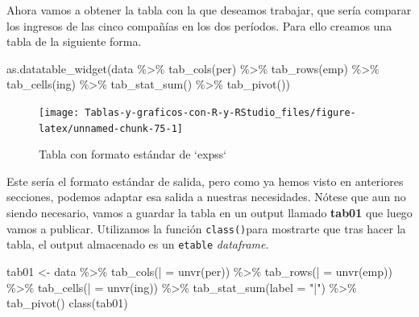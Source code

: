 \documentclass[
]{book}
\newenvironment{Shaded}{\begin{snugshade}}{\end{snugshade}}
\newcommand{\AttributeTok}[1]{\textcolor[rgb]{0.77,0.63,0.00}{#1}}
\newcommand{\FunctionTok}[1]{\textcolor[rgb]{0.00,0.00,0.00}{#1}}
\newcommand{\NormalTok}[1]{#1}
\newcommand{\OtherTok}[1]{\textcolor[rgb]{0.56,0.35,0.01}{#1}}
\newcommand{\SpecialCharTok}[1]{\textcolor[rgb]{0.00,0.00,0.00}{#1}}
\newcommand{\StringTok}[1]{\textcolor[rgb]{0.31,0.60,0.02}{#1}}
\begin{document}
Ahora vamos a obtener la tabla con la que deseamos trabajar, que sería comparar los ingresos de las cinco compañías en los dos períodos. Para ello creamos una tabla de la siguiente forma.

\begin{Shaded}
\begin{Highlighting}[]
\FunctionTok{as.datatable\_widget}\NormalTok{(data }\SpecialCharTok{\%\textgreater{}\%}
  \FunctionTok{tab\_cols}\NormalTok{(per) }\SpecialCharTok{\%\textgreater{}\%}
  \FunctionTok{tab\_rows}\NormalTok{(emp) }\SpecialCharTok{\%\textgreater{}\%}
  \FunctionTok{tab\_cells}\NormalTok{(ing) }\SpecialCharTok{\%\textgreater{}\%}
  \FunctionTok{tab\_stat\_sum}\NormalTok{() }\SpecialCharTok{\%\textgreater{}\%}
  \FunctionTok{tab\_pivot}\NormalTok{())}
\end{Highlighting}
\end{Shaded}

\begin{figure}[H]

{\centering \texttt{[image: Tablas-y-graficos-con-R-y-RStudio\_files/figure-latex/unnamed-chunk-75-1]} 

}

\caption{Tabla con formato estándar de `expss`}\label{fig:unnamed-chunk-75}
\end{figure}

Este sería el formato estándar de salida, pero como ya hemos visto en anteriores secciones, podemos adaptar esa salida a nuestras necesidades. Nótese que aun no siendo necesario, vamos a guardar la tabla en un output llamado \textbf{tab01} que luego vamos a publicar. Utilizamos la función \texttt{class()}para mostrarte que tras hacer la tabla, el output almacenado es un \texttt{etable} \emph{dataframe}.

\begin{Shaded}
\begin{Highlighting}[]
\NormalTok{tab01 }\OtherTok{\textless{}{-}}\NormalTok{ data }\SpecialCharTok{\%\textgreater{}\%}
  \FunctionTok{tab\_cols}\NormalTok{(}\StringTok{\textasciigrave{}}\AttributeTok{|}\StringTok{\textasciigrave{}} \OtherTok{=} \FunctionTok{unvr}\NormalTok{(per)) }\SpecialCharTok{\%\textgreater{}\%}
  \FunctionTok{tab\_rows}\NormalTok{(}\StringTok{\textasciigrave{}}\AttributeTok{|}\StringTok{\textasciigrave{}} \OtherTok{=} \FunctionTok{unvr}\NormalTok{(emp)) }\SpecialCharTok{\%\textgreater{}\%}
  \FunctionTok{tab\_cells}\NormalTok{(}\StringTok{\textasciigrave{}}\AttributeTok{|}\StringTok{\textasciigrave{}} \OtherTok{=} \FunctionTok{unvr}\NormalTok{(ing)) }\SpecialCharTok{\%\textgreater{}\%}
  \FunctionTok{tab\_stat\_sum}\NormalTok{(}\AttributeTok{label =} \StringTok{"|"}\NormalTok{) }\SpecialCharTok{\%\textgreater{}\%}
  \FunctionTok{tab\_pivot}\NormalTok{()}
\FunctionTok{class}\NormalTok{(tab01)}
\end{Highlighting}
\end{Shaded}
\end{document}
